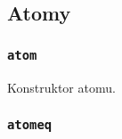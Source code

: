 \subsection{Atomy}
\label{viua_vm_ops_atom}

\subsubsection{\texttt{atom}}

Konstruktor atomu.

\subsubsection{\texttt{atomeq}}
